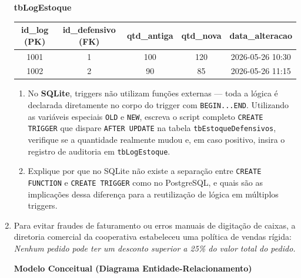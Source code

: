 \documentclass[12pt,a4paper]{article}
\newcommand{\resposta}[1]{}
\begin{document}
\begin{enumerate}[label=\textbf{Exercício \arabic* -}, leftmargin=*, itemsep=2.5em]
\begin{center}
    \textbf{tbLogEstoque} \\[0.1cm]
    \begin{tabular}{|c|c|c|c|c|}
        \hline
        \textbf{id\_log (PK)} & \textbf{id\_defensivo (FK)} & \textbf{qtd\_antiga} & \textbf{qtd\_nova} & \textbf{data\_alteracao} \\
        \hline
        1001 & 1 & 100 & 120 & 2026-05-26 10:30 \\
        1002 & 2 & 90 & 85 & 2026-05-26 11:15 \\
        \hline
    \end{tabular}
\end{center}

\begin{enumerate}[label=\textbf{\alph*)}]
    \item No \textbf{SQLite}, triggers não utilizam funções externas — toda a lógica é declarada diretamente no corpo do trigger com \texttt{BEGIN...END}. Utilizando as variáveis especiais \texttt{OLD} e \texttt{NEW}, escreva o script completo \texttt{CREATE TRIGGER} que dispare \texttt{AFTER UPDATE} na tabela \texttt{tbEstoqueDefensivos}, verifique se a quantidade realmente mudou e, em caso positivo, insira o registro de auditoria em \texttt{tbLogEstoque}.
    \resposta{4.5cm}

    \item Explique por que no SQLite não existe a separação entre \texttt{CREATE FUNCTION} e \texttt{CREATE TRIGGER} como no PostgreSQL, e quais são as implicações dessa diferença para a reutilização de lógica em múltiplos triggers.
    \resposta{3cm}
\end{enumerate}


\item Para evitar fraudes de faturamento ou erros manuais de digitação de caixas, a diretoria comercial da cooperativa estabeleceu uma política de vendas rígida: \textit{Nenhum pedido pode ter um desconto superior a 25\% do valor total do pedido.}

\begin{center}
    \textbf{Modelo Conceitual (Diagrama Entidade-Relacionamento)} \\[0.2cm]
\end{center}
\end{enumerate}
\end{document}
